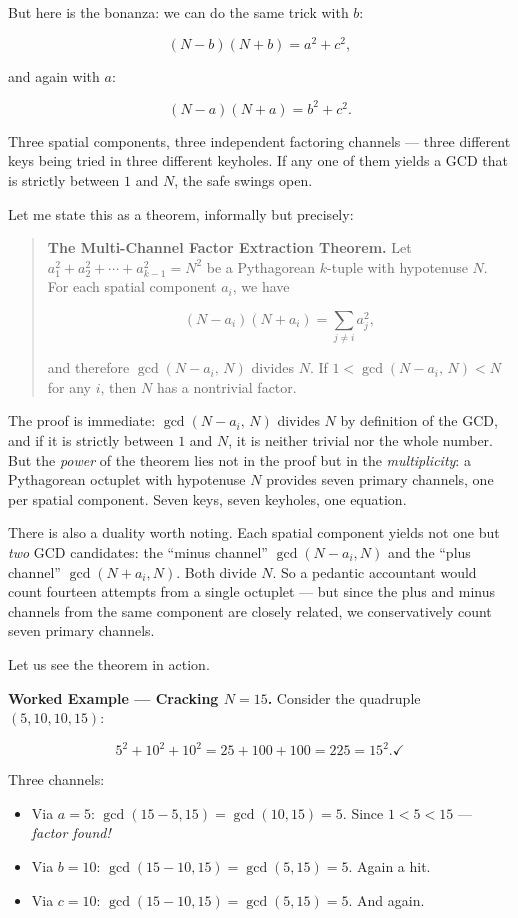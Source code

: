 But here is the bonanza: we can do the same trick with \(b\):

\[(N - b)(N + b) = a^2 + c^2,\]

and again with \(a\):

\[(N - a)(N + a) = b^2 + c^2.\]

Three spatial components, three independent factoring channels --- three different keys being tried in three different keyholes. If any one of them yields a GCD that is strictly between \(1\) and \(N\), the safe swings open.

Let me state this as a theorem, informally but precisely:

\begin{quote}
\textbf{The Multi-Channel Factor Extraction Theorem.} Let \(a_1^2 + a_2^2 + \cdots + a_{k-1}^2 = N^2\) be a Pythagorean \(k\)-tuple with hypotenuse \(N\). For each spatial component \(a_i\), we have

\[(N - a_i)(N + a_i) = \sum_{j \ne i} a_j^2,\]

and therefore \(\gcd(N - a_i, \, N)\) divides \(N\). If \(1 < \gcd(N - a_i, \, N) < N\) for any \(i\), then \(N\) has a nontrivial factor.
\end{quote}

The proof is immediate: \(\gcd(N - a_i, \, N)\) divides \(N\) by definition of the GCD, and if it is strictly between \(1\) and \(N\), it is neither trivial nor the whole number. But the \emph{power} of the theorem lies not in the proof but in the \emph{multiplicity}: a Pythagorean octuplet with hypotenuse \(N\) provides seven primary channels, one per spatial component. Seven keys, seven keyholes, one equation.

There is also a duality worth noting. Each spatial component yields not one but \emph{two} GCD candidates: the ``minus channel'' \(\gcd(N - a_i, N)\) and the ``plus channel'' \(\gcd(N + a_i, N)\). Both divide \(N\). So a pedantic accountant would count fourteen attempts from a single octuplet --- but since the plus and minus channels from the same component are closely related, we conservatively count seven primary channels.

Let us see the theorem in action.

\textbf{Worked Example --- Cracking \(N = 15\).} Consider the quadruple \((5, 10, 10, 15)\):

\[5^2 + 10^2 + 10^2 = 25 + 100 + 100 = 225 = 15^2. \checkmark\]

Three channels:

\begin{itemize}

\item
  Via \(a = 5\): \(\gcd(15 - 5, 15) = \gcd(10, 15) = 5\). Since \(1 < 5 < 15\) --- \emph{factor found!}
\item
  Via \(b = 10\): \(\gcd(15 - 10, 15) = \gcd(5, 15) = 5\). Again a hit.
\item
  Via \(c = 10\): \(\gcd(15 - 10, 15) = \gcd(5, 15) = 5\). And again.
\end{itemize}

